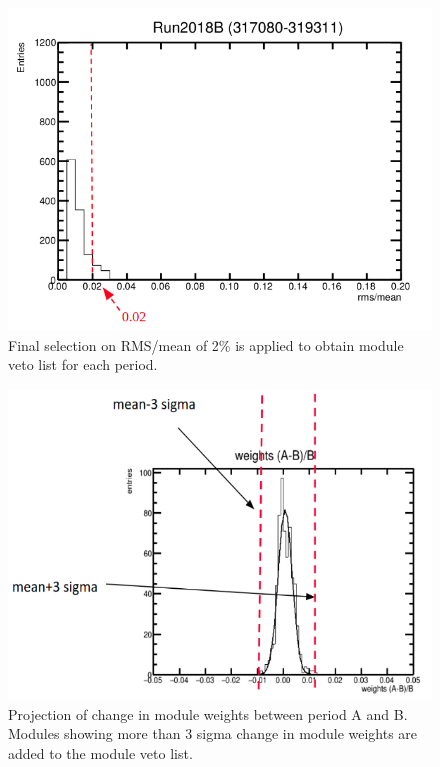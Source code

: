 \begin{figure}[!htp]
\centering
\includegraphics[width=1\textwidth]{ashish_thesis/second_iteration_cut.png}
\caption[Final iteration to remove outlier modules]{%
 Final selection on RMS/mean of 2\% is applied to obtain module veto list for each period.
}
\label{fig:sec_it_cut}
\end{figure}




\begin{figure}[!htp]
\centering
\includegraphics[width=1\textwidth]{ashish_thesis/mod_weight_comp_1.png}
\caption[Selection to remove modules due to change in module weights across period]{%
   Projection of change in module weights between period A and B. Modules showing more than 3 sigma change in module weights are added to the module veto list.
}
\label{fig:mod_w_com_1}
\end{figure}
   
